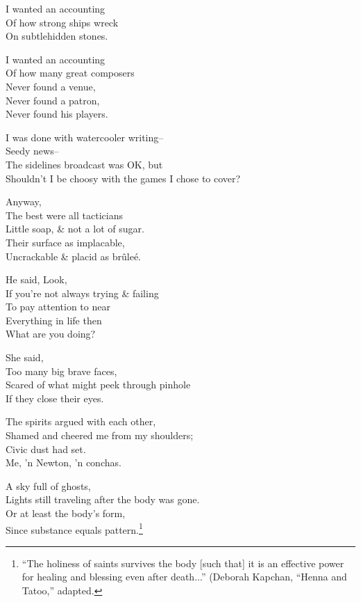 I wanted an accounting \\
Of how strong ships wreck \\
On subtlehidden stones. 

I wanted an accounting \\
Of how many great composers \\
Never found a venue, \\
Never found a patron, \\
Never found his players.

I was done with watercooler writing-- \\
Seedy news-- \\
The sidelines broadcast was OK, but \\
Shouldn't I be choosy with the games I chose to cover?

Anyway, \\
The best were all tacticians \\
Little soap, \& not a lot of sugar. \\
Their surface as implacable, \\
Uncrackable \& placid as brûleé.

He said, Look, \\
If you're not always trying \& failing \\
To pay attention to near \\
Everything in life then \\
What are you doing?

She said, \\
Too many big brave faces, \\
Scared of what might peek through pinhole \\
If they close their eyes.

The spirits argued with each other, \\
Shamed and cheered me from my shoulders; \\
Civic dust had set. \\
Me, 'n Newton, 'n conchas.

A sky full of ghosts, \\
Lights still traveling after the body was gone. \\
Or at least the body's form, \\
Since substance equals pattern.\footnote{``The holiness of saints survives the body [such that] it is an effective power for healing and blessing even after death...'' (Deborah Kapchan, ``Henna and Tatoo,'' adapted.}
